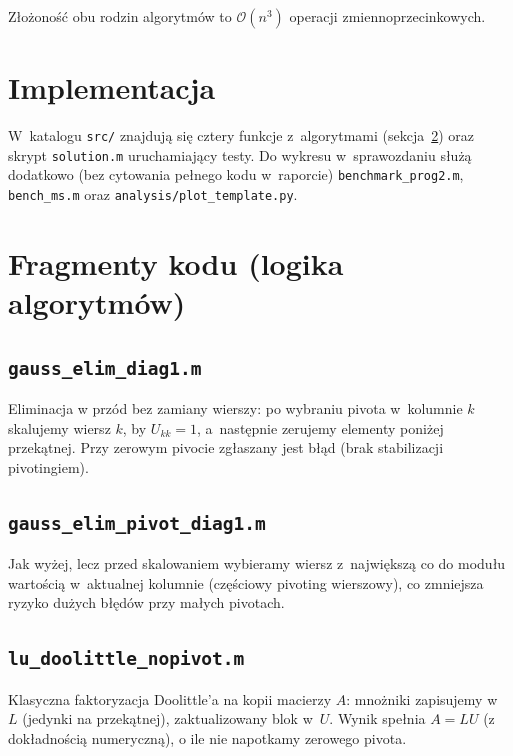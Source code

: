 \documentclass[polish]{template/projectreport}
\begin{document}
Złożoność obu rodzin algorytmów to $\mathcal{O}(n^3)$ operacji zmiennoprzecinkowych.

\section{Implementacja}
W~katalogu \texttt{src/} znajdują się cztery funkcje z~algorytmami (sekcja~\ref{sec:snippety}) oraz skrypt \texttt{solution.m} uruchamiający testy.
Do wykresu w~sprawozdaniu służą dodatkowo (bez cytowania pełnego kodu w~raporcie) \texttt{benchmark\_prog2.m}, \texttt{bench\_ms.m} oraz \texttt{analysis/plot\_template.py}.

\section{Fragmenty kodu (logika algorytmów)}
\label{sec:snippety}

\subsection{\texttt{gauss\_elim\_diag1.m}}
Eliminacja w przód bez zamiany wierszy: po wybraniu pivota w~kolumnie $k$ skalujemy wiersz $k$, by $U_{kk}=1$, a~następnie zerujemy elementy poniżej przekątnej. Przy zerowym pivocie zgłaszany jest błąd (brak stabilizacji pivotingiem).



\subsection{\texttt{gauss\_elim\_pivot\_diag1.m}}
Jak wyżej, lecz przed skalowaniem wybieramy wiersz z~największą co do modułu wartością w~aktualnej kolumnie (częściowy pivoting wierszowy), co zmniejsza ryzyko dużych błędów przy małych pivotach.



\subsection{\texttt{lu\_doolittle\_nopivot.m}}
Klasyczna faktoryzacja Doolittle'a na kopii macierzy $A$: mnożniki zapisujemy w~$L$ (jedynki na przekątnej), zaktualizowany blok w~$U$. Wynik spełnia $A=LU$ (z dokładnością numeryczną), o ile nie napotkamy zerowego pivota.


\end{document}
